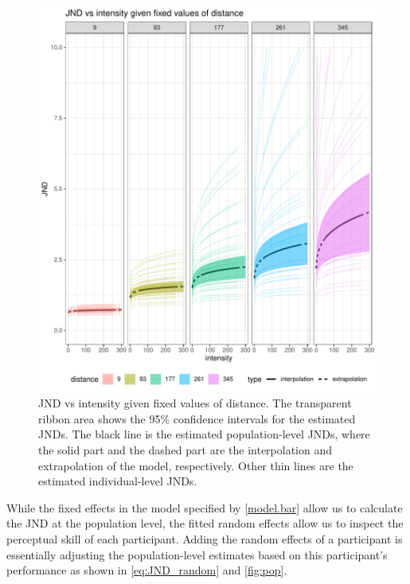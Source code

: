 \begin{knitrout}
\color{fgcolor}\begin{figure}
\includegraphics[width=\maxwidth]{figure/jnd_intensity_error-1} \caption[JND vs intensity given fixed values of distance]{JND vs intensity given fixed values of distance. The transparent ribbon area shows the 95\% confidence intervals for the estimated JNDs. The black line is the estimated population-level JNDs, where the solid part and the dashed part are the interpolation and extrapolation of the model, respectively. Other thin lines are the estimated individual-level JNDs. }\label{fig:jnd_intensity_error}
\end{figure}

\end{knitrout}


While the fixed effects in the model specified by \autoref{model.bar} allow us to calculate the JND at the population level, the fitted random effects allow us to inspect the perceptual skill of each participant. Adding the random effects of a participant is essentially adjusting the population-level estimates based on this participant's performance as shown in \autoref{eq:JND_random} and \autoref{fig:pop}. 

